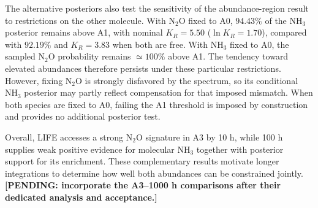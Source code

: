 The alternative posteriors also test the sensitivity of the abundance-region result to restrictions on the other molecule. With $\mathrm{N_2O}$ fixed to A0, $94.43\%$ of the $\mathrm{NH_3}$ posterior remains above A1, with nominal $K_R=5.50$ ($\ln K_R=1.70$), compared with $92.19\%$ and $K_R=3.83$ when both are free. With $\mathrm{NH_3}$ fixed to A0, the sampled $\mathrm{N_2O}$ probability remains $\simeq100\%$ above A1. The tendency toward elevated abundances therefore persists under these particular restrictions. However, fixing $\mathrm{N_2O}$ is strongly disfavored by the spectrum, so its conditional $\mathrm{NH_3}$ posterior may partly reflect compensation for that imposed mismatch. When both species are fixed to A0, failing the A1 threshold is imposed by construction and provides no additional posterior test.

Overall, LIFE accesses a strong $\mathrm{N_2O}$ signature in A3 by 10 h, while 100 h supplies weak positive evidence for molecular $\mathrm{NH_3}$ together with posterior support for its enrichment. These complementary results motivate longer integrations to determine how well both abundances can be constrained jointly. \textbf{[PENDING: incorporate the A3--1000 h comparisons after their dedicated analysis and acceptance.]}
